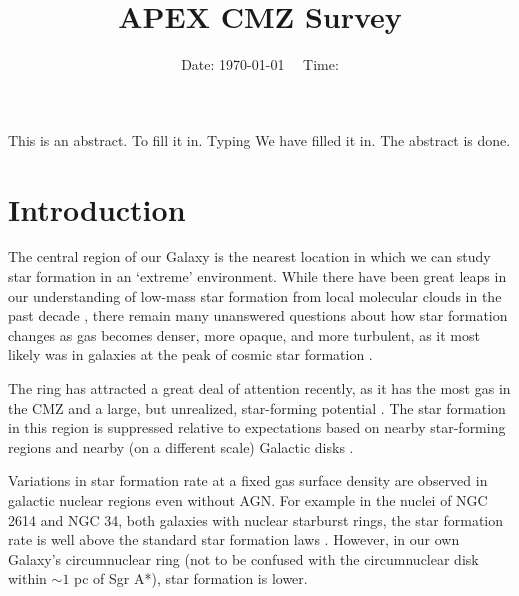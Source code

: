 



\title{APEX CMZ Survey}


\date{Date: \today ~~ Time: \currenttime}

\abstract
{This is an abstract.}
{To fill it in.}
{Typing}
{We have filled it in.}
{The abstract is done.}


\maketitle


\section{Introduction}
The central region of our Galaxy is the nearest location in which we can study
star formation in an `extreme' environment.  While there have been great leaps
in our understanding of low-mass star formation from local molecular clouds in
the past decade \citep{Lada2012a,Heiderman2010a,Lada2010a}, there remain many
unanswered questions about how star formation changes as gas becomes denser,
more opaque, and more turbulent, as it most likely was in galaxies at the peak
of cosmic star formation \citep{Kruijssen2013a}.




The \citet{Molinari2011a} ring has attracted a great deal of attention
recently, as it has the most gas in the CMZ and a large, but unrealized,
star-forming potential
\citep{Longmore2013a,Longmore2012b,Longmore2012a,Kruijssen2013a,Yusef-Zadeh2009a,Immer2012a}.
The star formation in this region is suppressed relative to expectations based
on nearby star-forming regions and nearby (on a different scale) Galactic
disks \citep{Kennicutt1998a,Kennicutt2012a,Leroy2013a,Heiderman2010a}.

Variations in star formation rate at a fixed gas surface density are observed
in galactic nuclear regions even without AGN.  For example in the nuclei of NGC
2614 and NGC 34, both galaxies with nuclear starburst rings, the star formation
rate is well above the standard star formation laws \citep{Xu2014b}.  However,
in our own Galaxy's circumnuclear ring (not to be confused with the
circumnuclear disk within $\sim1$ pc of Sgr A*), star formation is lower.

